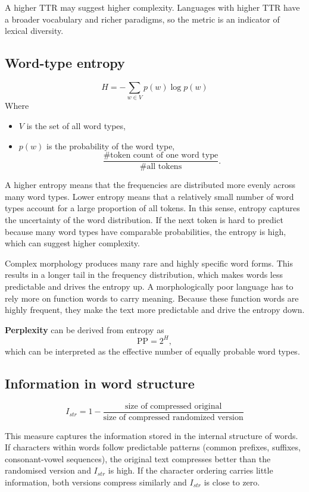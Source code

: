 A higher TTR may suggest higher complexity. Languages with higher TTR have a broader vocabulary and richer paradigms, so the metric is an indicator of lexical diversity.

\subsection{Word-type entropy}
\parencite{Coltekin2022}

$$
H=-\sum_{w \in V} p(w)\log p(w)
$$
Where
\begin{itemize}
    \item $V$ is the set of all word types,
    \item $p(w)$ is the probability of the word type, $$\frac{\text{\# token count of one word type}}{\text{\# all tokens}}.$$
\end{itemize}

A higher entropy means that the frequencies are distributed more evenly across many word types. Lower entropy means that a relatively small number of word types account for a large proportion of all tokens. In this sense, entropy captures the uncertainty of the word distribution. If the next token is hard to predict because many word types have comparable probabilities, the entropy is high, which can suggest higher complexity.

Complex morphology produces many rare and highly specific word forms. This results in a longer tail in the frequency distribution, which makes words less predictable and drives the entropy up. A morphologically poor language has to rely more on function words to carry meaning. Because these function words are highly frequent, they make the text more predictable and drive the entropy down.

\textbf{Perplexity} can be derived from entropy as
$$
\mathrm{PP} = 2^H,
$$
which can be interpreted as the effective number of equally probable word types.

\subsection{Information in word structure}
\parencite{Coltekin2022}
$$
I_{str}=1-\frac{\text{size of compressed original}}{\text{size of compressed randomized version}}
$$

This measure captures the information stored in the internal structure of words. If characters within words follow predictable patterns (common prefixes, suffixes, consonant-vowel sequences), the original text compresses better than the randomised version and $I_{str}$ is high. If the character ordering carries little information, both versions compress similarly and $I_{str}$ is close to zero.

